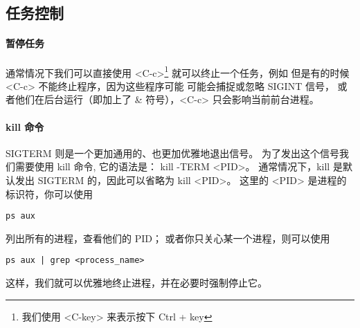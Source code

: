     \subsection{任务控制}\label{subsec:5}

        \paragraph{暂停任务}\label{par:暂停}
            通常情况下我们可以直接使用 <C-c>\footnote{我们使用 <C-key> 来表示按下 Ctrl + key} 就可以终止一个任务，例如
            但是有的时候 <C-c> 不能终止程序，因为这些程序可能 可能会捕捉或忽略 SIGINT 信号，
            或者他们在后台运行（即加上了 \& 符号），<C-c> 只会影响当前前台进程。

        \paragraph{kill 命令}
            SIGTERM 则是一个更加通用的、也更加优雅地退出信号。
            为了发出这个信号我们需要使用 kill 命令, 它的语法是： kill -TERM <PID>。
            通常情况下，kill 是默认发出 SIGTERM 的，因此可以省略为 kill <PID>。
            这里的 <PID> 是进程的标识符，你可以使用
            \begin{verbatim}
ps aux
            \end{verbatim}
            列出所有的进程，查看他们的 PID；
            或者你只关心某一个进程，则可以使用
            \begin{verbatim}
ps aux | grep <process_name>
            \end{verbatim}
            这样，我们就可以优雅地终止进程，并在必要时强制停止它。

